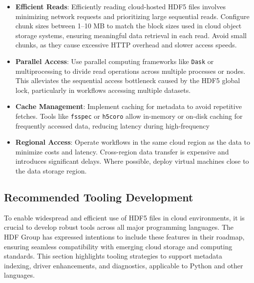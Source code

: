 \documentclass[
]{agujournal2019}
\providecommand{\tightlist}{%
  \setlength{\itemsep}{0pt}\setlength{\parskip}{0pt}}\usepackage{longtable,booktabs,array}
\begin{document}
\begin{itemize}
\tightlist
\item
  \textbf{Efficient Reads}: Efficiently reading cloud-hosted HDF5 files
  involves minimizing network requests and prioritizing large sequential
  reads. Configure chunk sizes between 1--10 MB to match the block sizes
  used in cloud object storage systems, ensuring meaningful data
  retrieval in each read. Avoid small chunks, as they cause excessive
  HTTP overhead and slower access speeds.
\item
  \textbf{Parallel Access}: Use parallel computing frameworks like
  \texttt{Dask} or multiprocessing to divide read operations across
  multiple processes or nodes. This alleviates the sequential access
  bottleneck caused by the HDF5 global lock, particularly in workflows
  accessing multiple datasets.
\item
  \textbf{Cache Management}: Implement caching for metadata to avoid
  repetitive fetches. Tools like \texttt{fsspec} or \texttt{h5coro}
  allow in-memory or on-disk caching for frequently accessed data,
  reducing latency during high-frequency
\item
  \textbf{Regional Access}: Operate workflows in the same cloud region
  as the data to minimize costs and latency. Cross-region data transfer
  is expensive and introduces significant delays. Where possible, deploy
  virtual machines close to the data storage region.
\end{itemize}

\subsection{Recommended Tooling
Development}\label{recommended-tooling-development}

To enable widespread and efficient use of HDF5 files in cloud
environments, it is crucial to develop robust tools across all major
programming languages. The HDF Group has expressed intentions to include
these features in their roadmap, ensuring seamless compatibility with
emerging cloud storage and computing standards. This section highlights
tooling strategies to support metadata indexing, driver enhancements,
and diagnostics, applicable to Python and other languages.
\end{document}
